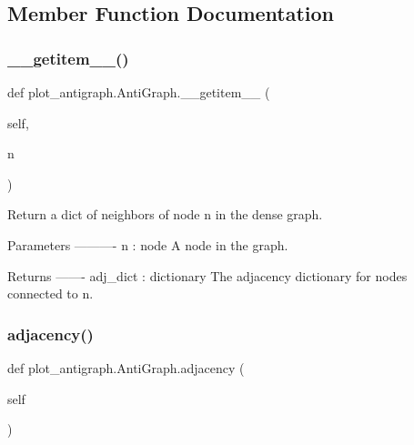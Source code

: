 \subsection{Member Function Documentation}
\mbox{\label{classplot__antigraph_1_1AntiGraph_ae3cedb5952f6856869af554e7e81d49b}} 
\subsubsection{\texorpdfstring{\+\_\+\+\_\+getitem\+\_\+\+\_\+()}{\_\_getitem\_\_()}}
{\footnotesize\ttfamily def plot\+\_\+antigraph.\+Anti\+Graph.\+\_\+\+\_\+getitem\+\_\+\+\_\+ (\begin{DoxyParamCaption}\item[{}]{self,  }\item[{}]{n }\end{DoxyParamCaption})}

\begin{DoxyVerb}Return a dict of neighbors of node n in the dense graph.

Parameters
----------
n : node
   A node in the graph.

Returns
-------
adj_dict : dictionary
   The adjacency dictionary for nodes connected to n.\end{DoxyVerb}
 \mbox{\label{classplot__antigraph_1_1AntiGraph_aeabbfd57523a9e4087d660f9463038b3}} 
\subsubsection{\texorpdfstring{adjacency()}{adjacency()}}
{\footnotesize\ttfamily def plot\+\_\+antigraph.\+Anti\+Graph.\+adjacency (\begin{DoxyParamCaption}\item[{}]{self }\end{DoxyParamCaption})}

